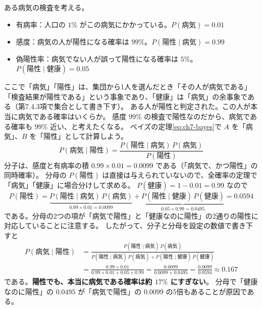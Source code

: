 ある病気の検査を考える。
\begin{itemize}
  \item 有病率：人口の $1\%$ がこの病気にかかっている。$P(\text{病気}) = 0.01$
  \item 感度：病気の人が陽性になる確率は $99\%$。$P(\text{陽性} \mid \text{病気}) = 0.99$
  \item 偽陽性率：病気でない人が誤って陽性になる確率は $5\%$。$P(\text{陽性} \mid \text{健康}) = 0.05$
\end{itemize}
ここで「病気」「陽性」は、集団から1人を選んだとき「その人が病気である」「検査結果が陽性である」という事象であり、「健康」は「病気」の余事象である（第7.4.3項で集合として書き下す）。
ある人が陽性と判定された。この人が本当に病気である確率はいくらか。
感度 $99\%$ の検査で陽性なのだから、病気である確率も $99\%$ 近い、と考えたくなる。
ベイズの定理\eqref{eq:ch7-bayes}で $A$ を「病気」、$B$ を「陽性」として計算しよう。
\begin{equation*}
  P(\text{病気} \mid \text{陽性}) = \frac{P(\text{陽性} \mid \text{病気})\,P(\text{病気})}{P(\text{陽性})}
\end{equation*}
分子は、感度と有病率の積 $0.99 \times 0.01 = 0.0099$ である（「病気で、かつ陽性」の同時確率）。
分母の $P(\text{陽性})$ は直接は与えられていないので、全確率の定理で「病気」「健康」に場合分けして求める。
$P(\text{健康}) = 1 - 0.01 = 0.99$ なので
\begin{equation*}
  P(\text{陽性}) = \underbrace{P(\text{陽性} \mid \text{病気})\,P(\text{病気})}_{0.99 \times 0.01 = 0.0099}
  + \underbrace{P(\text{陽性} \mid \text{健康})\,P(\text{健康})}_{0.05 \times 0.99 = 0.0495} = 0.0594
\end{equation*}
である。分母の2つの項が「病気で陽性」と「健康なのに陽性」の2通りの陽性に対応していることに注意する。
したがって、分子と分母を設定の数値で書き下すと
\begin{equation}
  \begin{aligned}
    P(\text{病気} \mid \text{陽性})
    &= \frac{P(\text{陽性} \mid \text{病気})\,P(\text{病気})}
            {P(\text{陽性} \mid \text{病気})\,P(\text{病気}) + P(\text{陽性} \mid \text{健康})\,P(\text{健康})} \\
    &= \frac{0.99 \times 0.01}{0.99 \times 0.01 + 0.05 \times 0.99}
     = \frac{0.0099}{0.0099 + 0.0495} = \frac{0.0099}{0.0594} \approx 0.167
  \end{aligned}
  \label{eq:ch7-test}
\end{equation}
である。\textbf{陽性でも、本当に病気である確率は約 $17\%$ にすぎない}。
分母で「健康なのに陽性」の $0.0495$ が「病気で陽性」の $0.0099$ の5倍もあることが原因である。

